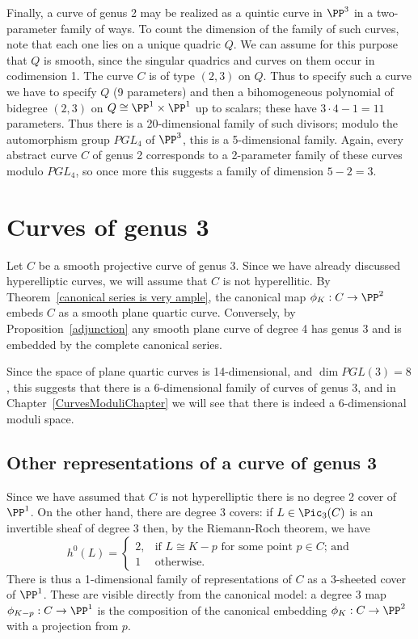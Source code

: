 Finally, a curve of genus 2 may be realized as a quintic curve in $\PP^3$ in a two-parameter family of ways. To count the dimension of the family of such curves, note that each one lies on a unique quadric $Q$. We can assume for this purpose that $Q$ is smooth, since the singular quadrics and curves on them occur in codimension 1. The curve $C$ is of type $(2,3)$ on $Q$. Thus to specify such a curve we have to specify $Q$ (9 parameters) and then a bihomogeneous polynomial of bidegree $(2,3)$ on $Q \cong \PP^1 \times \PP^1$ up to scalars; these have $3\cdot 4 - 1 = 11$ parameters. Thus there is a 20-dimensional family of such divisors; modulo the automorphism group $PGL_4$ of $\PP^3$, this is a 5-dimensional family. Again, every abstract curve $C$ of genus 2 corresponds to a 2-parameter family of these curves modulo $PGL_4$, so once more this suggests a family of dimension $ 5 - 2 = 3$.

\section{Curves of genus 3}

Let $C$ be a smooth projective curve of genus 3. Since we have already discussed hyperelliptic curves, 
we will assume  that $C$ is not hyperellitic. By
Theorem~\ref{canonical series is very ample}, the canonical map
$\phi_K : C \to \PP^2$ embeds $C$ as a smooth plane quartic curve.
Conversely, by Proposition~\ref{adjunction} any smooth plane curve of
degree 4 has genus 3 and is embedded by the complete canonical series.


Since the space of plane quartic curves is 14-dimensional, and $\dim PGL(3) = 8$, this suggests that
there is a 6-dimensional family of curves of genus 3, and in Chapter~\ref{CurvesModuliChapter}
we will see that there is indeed a 6-dimensional moduli space.

\subsection{Other representations of a curve of genus 3}\label{other genus 3}
Since we have assumed that $C$ is not hyperelliptic there is no degree 2 cover of $\PP^1$. On the other hand, there are degree 3 covers: if $L \in \Pic_3(C)$ is an invertible sheaf of degree 3 then, by the Riemann-Roch theorem, we have
$$
h^0(L) = 
\begin{cases}
2, &\text{if $L \cong K-p$ for some point $p \in C$; and} \\
1 &\text{otherwise.}
\end{cases}
$$
There is thus a 1-dimensional family of representations of $C$ as a 3-sheeted cover of $\PP^1$. These are  visible directly from the canonical model: a degree 3 map $\phi_{K-p} : C \to \PP^1$ is the composition of the canonical embedding $\phi_K : C \to \PP^2$ with a projection from $p$. 

